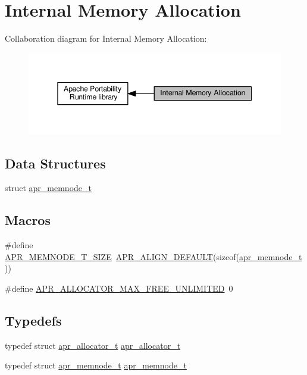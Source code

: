 \hypertarget{group__apr__allocator}{}\section{Internal Memory Allocation}
\label{group__apr__allocator}
Collaboration diagram for Internal Memory Allocation\+:
\nopagebreak
\begin{figure}[H]
\begin{center}
\leavevmode
\includegraphics[width=345pt]{group__apr__allocator}
\end{center}
\end{figure}
\subsection*{Data Structures}
\begin{DoxyCompactItemize}
\item 
struct \hyperlink{structapr__memnode__t}{apr\+\_\+memnode\+\_\+t}
\end{DoxyCompactItemize}
\subsection*{Macros}
\begin{DoxyCompactItemize}
\item 
\#define \hyperlink{group__apr__allocator_gaf382851817012929f4e2458b43f4482c}{A\+P\+R\+\_\+\+M\+E\+M\+N\+O\+D\+E\+\_\+\+T\+\_\+\+S\+I\+ZE}~\hyperlink{group__apr__general_gab484e98426221f3212fcb67af0467381}{A\+P\+R\+\_\+\+A\+L\+I\+G\+N\+\_\+\+D\+E\+F\+A\+U\+LT}(sizeof(\hyperlink{structapr__memnode__t}{apr\+\_\+memnode\+\_\+t}))
\item 
\#define \hyperlink{group__apr__allocator_ga54f32b19d8dad59bc6364a7a6b8ebec9}{A\+P\+R\+\_\+\+A\+L\+L\+O\+C\+A\+T\+O\+R\+\_\+\+M\+A\+X\+\_\+\+F\+R\+E\+E\+\_\+\+U\+N\+L\+I\+M\+I\+T\+ED}~0
\end{DoxyCompactItemize}
\subsection*{Typedefs}
\begin{DoxyCompactItemize}
\item 
typedef struct \hyperlink{structapr__allocator__t}{apr\+\_\+allocator\+\_\+t} \hyperlink{group__apr__allocator_ga1ceabfd30fcfc455e47d052d2a24244b}{apr\+\_\+allocator\+\_\+t}
\item 
typedef struct \hyperlink{structapr__memnode__t}{apr\+\_\+memnode\+\_\+t} \hyperlink{group__apr__allocator_ga3b6437036dfcdffbf87ad4677c818211}{apr\+\_\+memnode\+\_\+t}
\end{DoxyCompactItemize}
